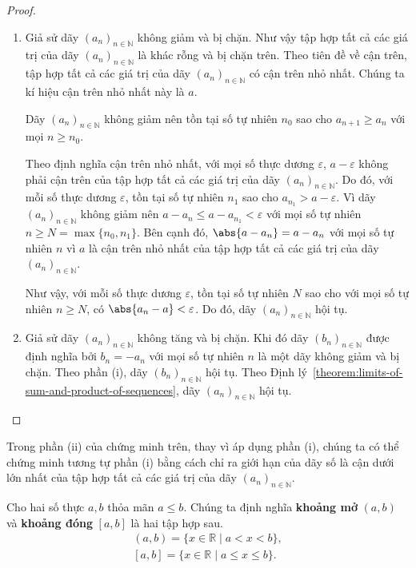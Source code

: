 \begin{proof}
    \begin{enumerate}[label={(\roman*)}]
        \item Giả sử dãy ${(a_{n})}_{n\in\mathbb{N}}$ không giảm và bị chặn. Như vậy tập hợp tất cả các giá trị của dãy ${(a_{n})}_{n\in\mathbb{N}}$ là khác rỗng và bị chặn trên. Theo tiên đề về cận trên, tập hợp tất cả các giá trị của dãy ${(a_{n})}_{n\in\mathbb{N}}$ có cận trên nhỏ nhất. Chúng ta kí hiệu cận trên nhỏ nhất này là $a$.

              Dãy ${(a_{n})}_{n\in\mathbb{N}}$ không giảm nên tồn tại số tự nhiên $n_{0}$ sao cho $a_{n+1}\geq a_{n}$ với mọi $n\geq n_{0}$.

              Theo định nghĩa cận trên nhỏ nhất, với mọi số thực dương $\varepsilon$, $a - \varepsilon$ không phải cận trên của tập hợp tất cả các giá trị của dãy ${(a_{n})}_{n\in\mathbb{N}}$. Do đó, với mỗi số thực dương $\varepsilon$, tồn tại số tự nhiên $n_{1}$ sao cho $a_{n_{1}} > a - \varepsilon$. Vì dãy ${(a_{n})}_{n\in\mathbb{N}}$ không giảm nên $a - a_{n}\leq a - a_{n_{1}} < \varepsilon$ với mọi số tự nhiên $n\geq N = \max\{ n_{0}, n_{1} \}$. Bên cạnh đó, $\abs{a - a_{n}} = a - a_{n}$ với mọi số tự nhiên $n$ vì $a$ là cận trên nhỏ nhất của tập hợp tất cả các giá trị của dãy ${(a_{n})}_{n\in\mathbb{N}}$.

              Như vậy, với mỗi số thực dương $\varepsilon$, tồn tại số tự nhiên $N$ sao cho với mọi số tự nhiên $n\geq N$, có $\abs{a_{n} - a} < \varepsilon$. Do đó, dãy ${(a_{n})}_{n\in\mathbb{N}}$ hội tụ.
        \item Giả sử dãy ${(a_{n})}_{n\in\mathbb{N}}$ không tăng và bị chặn. Khi đó dãy $(b_{n})_{n\in\mathbb{N}}$ được định nghĩa bởi $b_{n} = -a_{n}$ với mọi số tự nhiên $n$ là một dãy không giảm và bị chặn. Theo phần (i), dãy $(b_{n})_{n\in\mathbb{N}}$ hội tụ. Theo Định lý~\ref{theorem:limits-of-sum-and-product-of-sequences}, dãy ${(a_{n})}_{n\in\mathbb{N}}$ hội tụ.
    \end{enumerate}
\end{proof}

Trong phần (ii) của chứng minh trên, thay vì áp dụng phần (i), chúng ta có thể chứng minh tương tự phần (i) bằng cách chỉ ra giới hạn của dãy số là cận dưới lớn nhất của tập hợp tất cả các giá trị của dãy ${(a_{n})}_{n\in\mathbb{N}}$.

\begin{definition}
    Cho hai số thực $a, b$ thỏa mãn $a\leq b$. Chúng ta định nghĩa \textbf{khoảng mở} $(a, b)$ và \textbf{khoảng đóng} $[a, b]$ là hai tập hợp sau.
    \[
        \begin{split}
            (a, b) = \{ x\in\mathbb{R} \mid a < x < b \}, \\
            [a, b] = \{ x\in\mathbb{R} \mid a\leq x\leq b \}.
        \end{split}
    \]
\end{definition}

